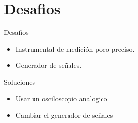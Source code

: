 \section{Desafios}
\begin{frame}{Desafios}
  \begin{itemize}
    \item Instrumental de medición poco preciso.
    \item Generador de señales.
  \end{itemize}
\end{frame}

\begin{frame}{Soluciones}
  \begin{itemize}
    \item Usar un osciloscopio analogico
    \item Cambiar el generador de señales
  \end{itemize}
\end{frame}
